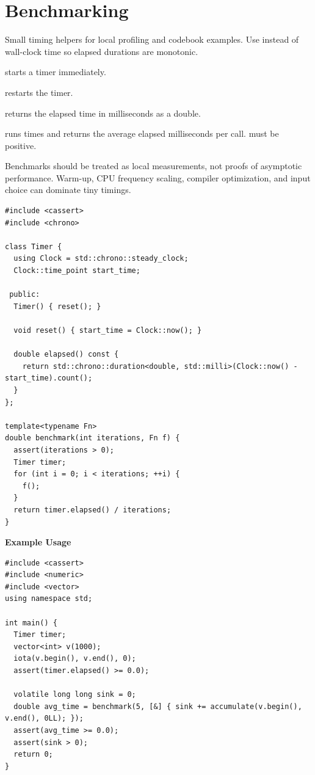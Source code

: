 \section{\texorpdfstring{Benchmarking}{8.5 Benchmarking}}
\setcounter{section}{5}
\label{sec:8.5}
Small timing helpers for local profiling and codebook examples. Use  instead of wall-clock time so elapsed durations are monotonic.

\begin{compactitem}
  \item {} starts a timer immediately.
  \item {} restarts the timer.
  \item {} returns the elapsed time in milliseconds as a double.
  \item {} runs   times and returns the average elapsed milliseconds per call.  must be positive.
\end{compactitem}

Benchmarks should be treated as local measurements, not proofs of asymptotic performance. Warm-up, CPU frequency scaling, compiler optimization, and input choice can dominate tiny timings.

\begin{lstlisting}[style=cpp]
#include <cassert>
#include <chrono>

class Timer {
  using Clock = std::chrono::steady_clock;
  Clock::time_point start_time;

 public:
  Timer() { reset(); }

  void reset() { start_time = Clock::now(); }

  double elapsed() const {
    return std::chrono::duration<double, std::milli>(Clock::now() - start_time).count();
  }
};

template<typename Fn>
double benchmark(int iterations, Fn f) {
  assert(iterations > 0);
  Timer timer;
  for (int i = 0; i < iterations; ++i) {
    f();
  }
  return timer.elapsed() / iterations;
}
\end{lstlisting}
\textbf{Example Usage}\par
\begin{lstlisting}[style=cpp]
#include <cassert>
#include <numeric>
#include <vector>
using namespace std;

int main() {
  Timer timer;
  vector<int> v(1000);
  iota(v.begin(), v.end(), 0);
  assert(timer.elapsed() >= 0.0);

  volatile long long sink = 0;
  double avg_time = benchmark(5, [&] { sink += accumulate(v.begin(), v.end(), 0LL); });
  assert(avg_time >= 0.0);
  assert(sink > 0);
  return 0;
}
\end{lstlisting}

